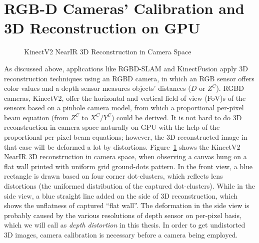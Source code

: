 \section{RGB-D Cameras' Calibration and 3D Reconstruction on GPU}
\label{sectionRGBDcameraCalibration}
\indent
 \begin{figure}[b]
{}
\caption{KinectV2 NearIR 3D Reconstruction in Camera Space}
\label{NearIR}
\end{figure}%
%
As discussed above, applications like RGBD-SLAM and KinectFusion apply 3D reconstruction techniques using an RGBD camera, in which an RGB sensor offers color values and a depth sensor measures objects' distances (\(D\) or \(Z^C\)). RGBD cameras,  KinectV2, offer the horizontal and vertical field of view (FoV)s of the sensors based on a pinhole camera model, from which a proportional per-pixel beam equation (from \(Z^C\) to \(X^C/Y^C\)) could be derived. It is not hard to do 3D reconstruction in camera space naturally on GPU with the help of the proportional per-pixel beam equations; however, the 3D reconstructed image in that case will be deformed a lot by distortions. Figure~\ref{NearIR} shows the KinectV2 NearIR 3D reconstruction in camera space, when observing a canvas hung on a flat wall printed with uniform grid ground-dots pattern. In the front view, a blue rectangle is drawn based on four corner dot-clusters, which reflects lens distortions (the uniformed distribution of the captured dot-clusters). While in the side view, a blue straight line added on the side of 3D reconstruction, which shows the unflatness of captured \enquote{flat wall}. The deformation in the side view is probably caused by the various resolutions of depth sensor on per-pixel basis, which we will call as \emph{depth distortion} in this thesis. In order to get undistorted 3D images, camera calibration is necessary before a camera being employed.%
\\\indent%
